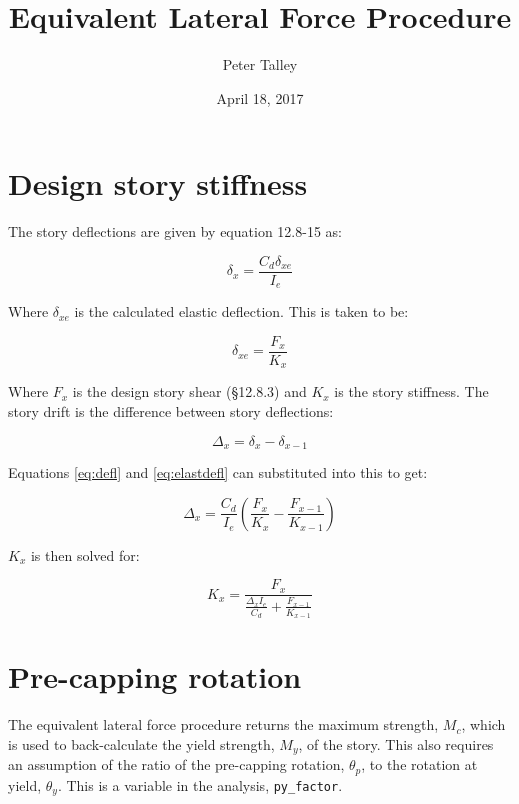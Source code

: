 \documentclass[11pt,letterpaper]{article}
\title{Equivalent Lateral Force Procedure}
\author{Peter Talley}
\date{April 18, 2017}
\begin{document}
\maketitle

\section{Design story stiffness}
The story deflections are given by equation 12.8-15 as:

\begin{equation} \label{eq:defl}
    \delta_x = \frac{C_d \delta_{xe}}{I_e}
\end{equation}

Where $\delta_{xe}$ is the calculated elastic deflection. This is taken to be:

\begin{equation} \label{eq:elastdefl}
	\delta_{xe} = \frac{F_x}{K_x}
\end{equation}

Where $F_x$ is the design story shear (\S 12.8.3) and $K_x$ is the story stiffness. The story drift is the difference between story deflections:

\begin{equation} \label{eq:drift}
	\Delta_x = \delta_x - \delta_{x-1}
\end{equation}

Equations \eqref{eq:defl} and \eqref{eq:elastdefl} can substituted into this to get:

\begin{equation} \label{eq:driftsubs}
	\Delta_x = \frac{C_d}{I_e} \left(\frac{F_x}{K_x} - \frac{F_{x-1}}{K_{x-1}}\right)
\end{equation}

$K_x$ is then solved for:

\begin{equation} \label{eq:stiffness}
    K_x = \frac{F_x}{\frac{\Delta_x I_e}{C_d} + \frac{F_{x-1}}{K_{x-1}}}
\end{equation}

\section{Pre-capping rotation}
The equivalent lateral force procedure returns the maximum strength, $M_c$, which is used to back-calculate the yield strength, $M_y$, of the story. This also requires an assumption of the ratio of the pre-capping rotation, $θ_p$, to the rotation at yield, $θ_y$. This is a variable in the analysis, \texttt{py\_factor}.
\end{document}
